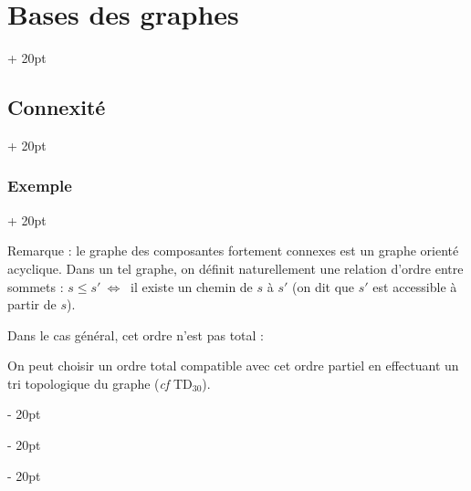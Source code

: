 \documentclass[a4paper, 12pt, twoside]{article}
\newcommand{\ssi}{\ \Leftrightarrow \ }
\renewcommand{\le}{\leqslant}
\newcommand{\ind}[1][20pt]{\advance\leftskip + #1}
\newcommand{\deind}[1][20pt]{\advance\leftskip - #1}
\newenvironment{indt}[2][20pt]{#2 \par \ind[#1]}{\par \deind} %
\begin{document}
\begin{indt}{\section{Bases des graphes}}
\begin{indt}{\subsection{Connexité}}
\begin{indt}{\subsubsection{Exemple}}
\begin{center}
                \end{center}

                Remarque : le graphe des composantes fortement connexes est un graphe orienté acyclique.
                Dans un tel graphe, on définit naturellement une relation d'ordre entre sommets : $s \le s' \ssi$ il existe un chemin de $s$ à $s'$ (on dit que $s'$ est accessible à partir de $s$).

                Dans le cas général, cet ordre n'est pas total :

                \begin{center}
                \end{center}

                On peut choisir un ordre total compatible avec cet ordre partiel en effectuant un tri topologique du graphe (\textit{cf} TD$_{30}$).
            \end{indt}
        \end{indt}
    \end{indt}

    \vspace{12pt}
    
\end{document}
